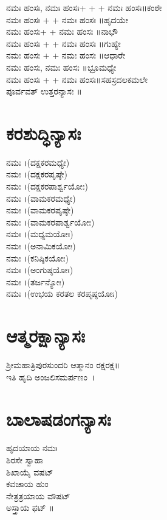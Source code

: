  ನಮಃ ಹಂಸಃ,  ನಮಃ ಹಂಸಃ+ + + ನಮಃ ಹಂಸಃ॥ಕಂಠೇ\\
 ನಮಃ ಹಂಸಃ + +  ನಮಃ ಹಂಸಃ ॥ಹೃದಯೇ\\
 ನಮಃ ಹಂಸಃ+ +  ನಮಃ ಹಂಸಃ ॥ನಾಭೌ\\
 ನಮಃ ಹಂಸಃ + +  ನಮಃ ಹಂಸಃ ॥ಗುಹ್ಯೇ\\
 ನಮಃ ಹಂಸಃ + +  ನಮಃ ಹಂಸಃ ॥ಆಧಾರೇ\\
 ನಮಃ ಹಂಸಃ,  ನಮಃ ಹಂಸಃ ॥ಭ್ರೂಮಧ್ಯೇ\\
 ನಮಃ ಹಂಸಃ + + ನಮಃ ಹಂಸಃ॥ಸಹಸ್ರದಲಕಮಲೇ\\
 ಪೂರ್ವವತ್ ಉತ್ತರನ್ಯಾಸಃ ॥
\section{ಕರಶುದ್ಧಿನ್ಯಾಸಃ}
 ನಮಃ ।(ದಕ್ಷಕರಮಧ್ಯೇ)\\
 ನಮಃ ।(ದಕ್ಷಕರಪೃಷ್ಠೇ)\\
 ನಮಃ ।(ದಕ್ಷಕರಪಾರ್ಶ್ವಯೋಃ)\\
 ನಮಃ ।(ವಾಮಕರಮಧ್ಯೇ)\\
 ನಮಃ ।(ವಾಮಕರಪೃಷ್ಠೇ)\\
 ನಮಃ ।(ವಾಮಕರಪಾರ್ಶ್ವಯೋಃ)\\
 ನಮಃ ।(ಮಧ್ಯಮಯೋಃ)\\
 ನಮಃ ।(ಅನಾಮಿಕಯೋಃ)\\
 ನಮಃ ।(ಕನಿಷ್ಠಿಕಯೋಃ)\\
 ನಮಃ ।(ಅಂಗುಷ್ಠಯೋಃ)\\
 ನಮಃ ।(ತರ್ಜನ್ಯೋಃ)\\
 ನಮಃ ।(ಉಭಯ ಕರತಲ ಕರಪೃಷ್ಠಯೋಃ)

\section{ಆತ್ಮರಕ್ಷಾನ್ಯಾಸಃ}
 ಶ್ರೀಮಹಾತ್ರಿಪುರಸುಂದರಿ ಆತ್ಮಾನಂ ರಕ್ಷರಕ್ಷ॥\\ಇತಿ ಹೃದಿ ಅಂಜಲಿಸಮರ್ಪಣಂ~।
\section{ಬಾಲಾಷಡಂಗನ್ಯಾಸಃ}
 ಹೃದಯಾಯ ನಮಃ\\
 ಶಿರಸೇ ಸ್ವಾಹಾ\\
ಶಿಖಾಯೈ ವಷಟ್\\
 ಕವಚಾಯ ಹುಂ\\
ನೇತ್ರತ್ರಯಾಯ ವೌಷಟ್\\
 ಅಸ್ತ್ರಾಯ ಫಟ್ ॥
